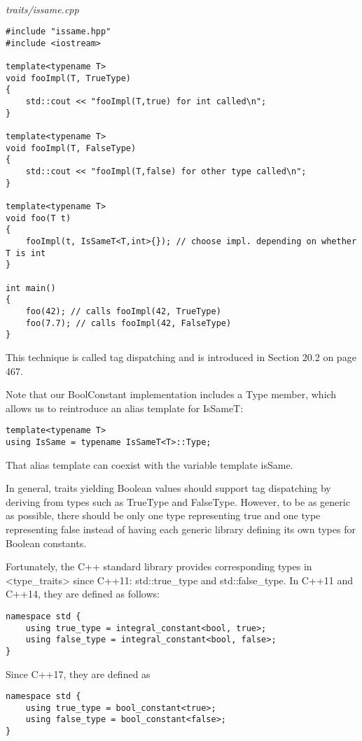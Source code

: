 \hspace*{\fill} \\ %
\noindent
\textit{traits/issame.cpp}
\begin{lstlisting}[style=styleCXX]
#include "issame.hpp"
#include <iostream>

template<typename T>
void fooImpl(T, TrueType)
{
	std::cout << "fooImpl(T,true) for int called\n";
}

template<typename T>
void fooImpl(T, FalseType)
{
	std::cout << "fooImpl(T,false) for other type called\n";
}

template<typename T>
void foo(T t)
{
	fooImpl(t, IsSameT<T,int>{}); // choose impl. depending on whether T is int
}

int main()
{
	foo(42); // calls fooImpl(42, TrueType)
	foo(7.7); // calls fooImpl(42, FalseType)
}
\end{lstlisting}

This technique is called tag dispatching and is introduced in Section 20.2 on page 467.

Note that our BoolConstant implementation includes a Type member, which allows us to reintroduce an alias template for IsSameT:

\begin{lstlisting}[style=styleCXX]
template<typename T>
using IsSame = typename IsSameT<T>::Type;
\end{lstlisting}

That alias template can coexist with the variable template isSame.

In general, traits yielding Boolean values should support tag dispatching by deriving from types such as TrueType and FalseType. However, to be as generic as possible, there should be only one type representing true and one type representing false instead of having each generic library defining its own types for Boolean constants.

Fortunately, the C++ standard library provides corresponding types in <type\_traits> since C++11: std::true\_type and std::false\_type. In C++11 and C++14, they are defined as follows:

\begin{lstlisting}[style=styleCXX]
namespace std {
	using true_type = integral_constant<bool, true>;
	using false_type = integral_constant<bool, false>;
}
\end{lstlisting}

Since C++17, they are defined as

\begin{lstlisting}[style=styleCXX]
namespace std {
	using true_type = bool_constant<true>;
	using false_type = bool_constant<false>;
}
\end{lstlisting}

